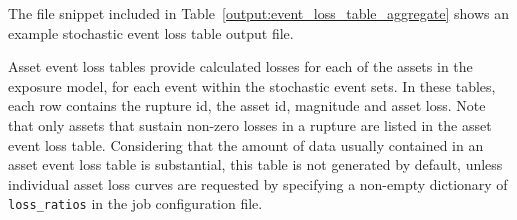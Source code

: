 The file snippet included in Table~\ref{output:event_loss_table_aggregate}
shows an example stochastic event loss table output file.




Asset event loss tables provide calculated losses for each of the assets in
the exposure model, for each event within the stochastic event sets. In these
tables, each row contains the rupture id, the asset id, magnitude and asset
loss. Note that only assets that sustain non-zero losses in a rupture are
listed in the asset event loss table. Considering that the amount of data
usually contained in an asset event loss table is substantial, this table is
not generated by default, unless individual asset loss curves are requested by
specifying a non-empty dictionary of \Verb+loss_ratios+ in the job
configuration file. 

